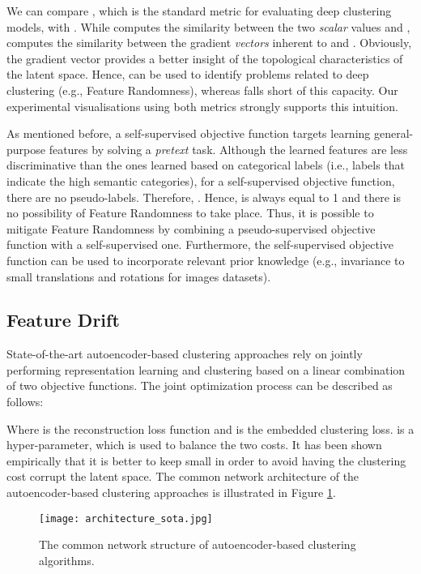 \documentclass{article}
\begin{document}
We can compare , which is the standard metric for evaluating deep clustering models, with . While  computes the similarity between the two \textit{scalar} values  and ,   computes the similarity between the gradient \textit{vectors} inherent to  and . Obviously, the gradient vector provides a better insight of the topological characteristics of the latent space. Hence,  can be used to identify problems related to deep clustering (e.g., Feature Randomness), whereas  falls short of this capacity. Our experimental visualisations using both metrics strongly supports this intuition.

As mentioned before, a self-supervised objective function targets learning general-purpose features by solving a \textit{pretext} task. Although the learned features are less discriminative than the ones learned based on categorical labels (i.e., labels that indicate the high semantic categories), for a self-supervised objective function, there are no pseudo-labels. Therefore, . Hence,   is always equal to 1 and there is no possibility of Feature Randomness to take place. Thus, it is possible to mitigate Feature Randomness by combining a pseudo-supervised objective function with a self-supervised one. Furthermore, the self-supervised objective function can be used to incorporate relevant prior knowledge (e.g., invariance to small translations and rotations for images datasets). 






\subsection{Feature Drift}

State-of-the-art autoencoder-based clustering approaches rely on jointly performing representation learning and clustering based on a linear combination of two objective functions. The joint optimization process can be described as follows:



Where  is the reconstruction loss function and  is the embedded clustering loss.  is a hyper-parameter, which is used to balance the two costs. It has been shown empirically \cite{paper28} that it is better to keep  small in order to avoid having the clustering cost corrupt the latent space. The common network architecture of the autoencoder-based clustering approaches is illustrated in Figure \ref{fig:architecture_sota}.

\begin{figure}[ht]
\vskip 0.2in
\begin{center}
\centerline{\texttt{[image: architecture\_sota.jpg]}}
\caption{The common network structure of autoencoder-based clustering algorithms.}
\label{fig:architecture_sota}
\end{center}
\vskip -0.2in
\end{figure}
\end{document}
